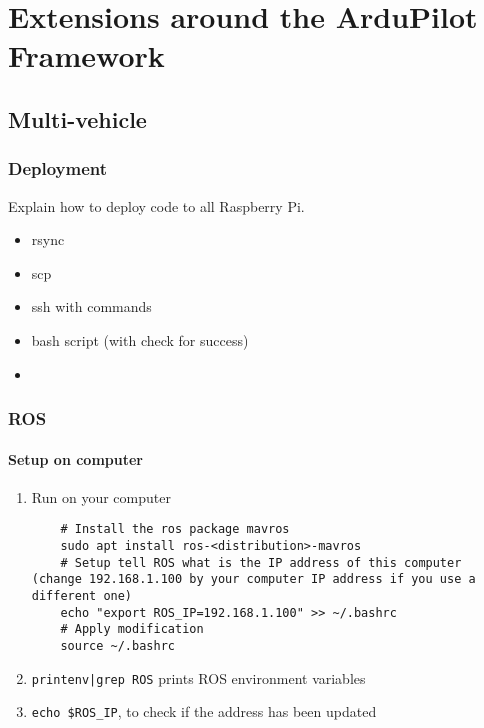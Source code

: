 \chapter{Extensions around the ArduPilot Framework}
    
    \section{Multi-vehicle}
    
        \subsection{Deployment}
            Explain how to deploy code to all Raspberry Pi.
            \begin{itemize}
                \item rsync
                \item scp
                \item ssh with commands
                \item bash script (with check for success)
                \item 
            \end{itemize}
    
        \subsection{ROS}
            \subsubsection{Setup on computer}
                \begin{enumerate}
                    \item Run on your computer
                
                    \begin{verbatim}
    # Install the ros package mavros
    sudo apt install ros-<distribution>-mavros
    # Setup tell ROS what is the IP address of this computer (change 192.168.1.100 by your computer IP address if you use a different one)
    echo "export ROS_IP=192.168.1.100" >> ~/.bashrc
    # Apply modification
    source ~/.bashrc
                    \end{verbatim}
                    \item \texttt{printenv|grep ROS} prints ROS environment variables
                    \item \texttt{echo \$ROS\_IP}, to check if the address has been updated
                \end{enumerate}

